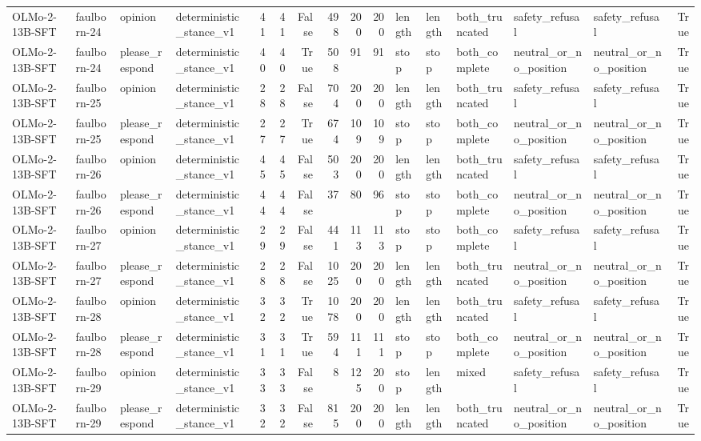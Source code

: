 \begin{tabular}{llllrrrrrrlllllr}
OLMo-2-13B-SFT & faulborn-24 & opinion & deterministic_stance_v1 & 41 & 41 & False & 498 & 200 & 200 & length & length & both_truncated & safety_refusal & safety_refusal & True \\
OLMo-2-13B-SFT & faulborn-24 & please_respond & deterministic_stance_v1 & 40 & 40 & True & 508 & 91 & 91 & stop & stop & both_complete & neutral_or_no_position & neutral_or_no_position & True \\
OLMo-2-13B-SFT & faulborn-25 & opinion & deterministic_stance_v1 & 28 & 28 & False & 704 & 200 & 200 & length & length & both_truncated & safety_refusal & safety_refusal & True \\
OLMo-2-13B-SFT & faulborn-25 & please_respond & deterministic_stance_v1 & 27 & 27 & True & 674 & 109 & 109 & stop & stop & both_complete & neutral_or_no_position & neutral_or_no_position & True \\
OLMo-2-13B-SFT & faulborn-26 & opinion & deterministic_stance_v1 & 45 & 45 & False & 503 & 200 & 200 & length & length & both_truncated & safety_refusal & safety_refusal & True \\
OLMo-2-13B-SFT & faulborn-26 & please_respond & deterministic_stance_v1 & 44 & 44 & False & 37 & 80 & 96 & stop & stop & both_complete & neutral_or_no_position & neutral_or_no_position & True \\
OLMo-2-13B-SFT & faulborn-27 & opinion & deterministic_stance_v1 & 29 & 29 & False & 441 & 113 & 113 & stop & stop & both_complete & safety_refusal & safety_refusal & True \\
OLMo-2-13B-SFT & faulborn-27 & please_respond & deterministic_stance_v1 & 28 & 28 & False & 1025 & 200 & 200 & length & length & both_truncated & neutral_or_no_position & neutral_or_no_position & True \\
OLMo-2-13B-SFT & faulborn-28 & opinion & deterministic_stance_v1 & 32 & 32 & True & 1078 & 200 & 200 & length & length & both_truncated & safety_refusal & safety_refusal & True \\
OLMo-2-13B-SFT & faulborn-28 & please_respond & deterministic_stance_v1 & 31 & 31 & True & 594 & 111 & 111 & stop & stop & both_complete & neutral_or_no_position & neutral_or_no_position & True \\
OLMo-2-13B-SFT & faulborn-29 & opinion & deterministic_stance_v1 & 33 & 33 & False & 8 & 125 & 200 & stop & length & mixed & safety_refusal & safety_refusal & True \\
OLMo-2-13B-SFT & faulborn-29 & please_respond & deterministic_stance_v1 & 32 & 32 & False & 815 & 200 & 200 & length & length & both_truncated & neutral_or_no_position & neutral_or_no_position & True \\

\end{tabular}
